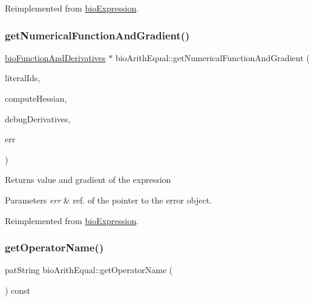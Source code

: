 Reimplemented from \hyperlink{classbio_expression_a3e4b4dca58dbbc6f0e411b30eb3f60b4}{bio\+Expression}.

\mbox{\label{classbio_arith_equal_a9462014bd44ab537c4e6d631a46e97b7}} 
\subsubsection{\texorpdfstring{get\+Numerical\+Function\+And\+Gradient()}{getNumericalFunctionAndGradient()}}
{\footnotesize\ttfamily \hyperlink{classbio_function_and_derivatives}{bio\+Function\+And\+Derivatives} $\ast$ bio\+Arith\+Equal\+::get\+Numerical\+Function\+And\+Gradient (\begin{DoxyParamCaption}\item[{vector$<$ pat\+U\+Long $>$}]{literal\+Ids,  }\item[{pat\+Boolean}]{compute\+Hessian,  }\item[{pat\+Boolean}]{debug\+Derivatives,  }\item[{pat\+Error $\ast$\&}]{err }\end{DoxyParamCaption})\hspace{0.3cm}{\ttfamily [virtual]}}

\begin{DoxyReturn}{Returns}
value and gradient of the expression 
\end{DoxyReturn}

\begin{DoxyParams}{Parameters}
{\em err} & ref. of the pointer to the error object. \\
\hline
\end{DoxyParams}


Reimplemented from \hyperlink{classbio_expression_a91c81ce80c9e972c913b10f5f3c1ed13}{bio\+Expression}.

\mbox{\label{classbio_arith_equal_ab4a9657d32f37ab61fbe2597b3c4b9eb}} 
\subsubsection{\texorpdfstring{get\+Operator\+Name()}{getOperatorName()}}
{\footnotesize\ttfamily pat\+String bio\+Arith\+Equal\+::get\+Operator\+Name (\begin{DoxyParamCaption}{ }\end{DoxyParamCaption}) const\hspace{0.3cm}{\ttfamily [virtual]}}

